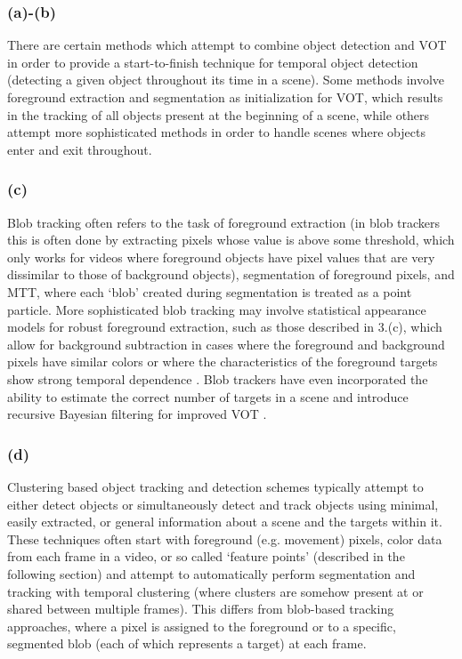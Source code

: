 \documentclass{article}
\begin{document}
\subsubsection*{(a)-(b)}
There are certain methods which attempt to combine object detection and VOT in order to provide a start-to-finish technique for temporal object detection (detecting a given object throughout its time in a scene). Some methods involve foreground extraction and segmentation as initialization for VOT, which results in the tracking of all objects present at the beginning of a scene, while others attempt more sophisticated methods in order to handle scenes where objects enter and exit throughout.

\subsubsection*{(c)}
Blob tracking often refers to the task of foreground extraction (in blob trackers this is often done by extracting pixels whose value is above some threshold, which only works for videos where foreground objects have pixel values that are very dissimilar to those of background objects), segmentation of foreground pixels, and MTT, where each `blob' created during segmentation is treated as a point particle. More sophisticated blob tracking may involve statistical appearance models for robust foreground extraction, such as those described in 3.(c), which allow for background subtraction in cases where the foreground and background pixels have similar colors or where the characteristics of the foreground targets show strong temporal dependence \citep{stauffer_1999, wren_1997, kjeldsen_1996}. Blob trackers have even incorporated the ability to estimate the correct number of targets in a scene and introduce recursive Bayesian filtering for improved VOT \citep{isard_2001}.

\subsubsection*{(d)}
Clustering based object tracking and detection schemes typically attempt to either detect objects or simultaneously detect and track objects using minimal, easily extracted, or general information about a scene and the targets within it. These techniques often start with foreground (e.g. movement) pixels, color data from each frame in a video, or so called `feature points' (described in the following section) and attempt to automatically perform segmentation and tracking with temporal clustering (where clusters are somehow present at or shared between multiple frames). This differs from blob-based tracking approaches, where a pixel is assigned to the foreground or to a specific, segmented blob (each of which represents a target) at each frame.
\end{document}
